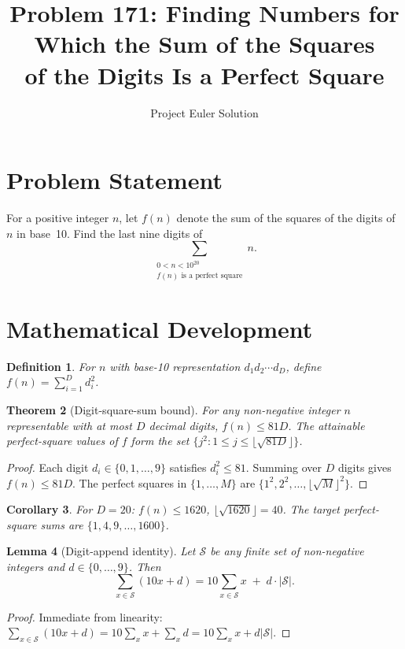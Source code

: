 \documentclass[11pt]{article}
\title{Problem 171: Finding Numbers for Which the Sum of the Squares\\of the Digits Is a Perfect Square}
\author{Project Euler Solution}
\date{}
\newtheorem{theorem}{Theorem}
\newtheorem{lemma}[theorem]{Lemma}
\newtheorem{corollary}[theorem]{Corollary}
\newtheorem{definition}[theorem]{Definition}
\begin{document}
\maketitle

\section{Problem Statement}

For a positive integer $n$, let $f(n)$ denote the sum of the squares of the digits of $n$ in base~10. Find the last nine digits of
\[
\sum_{\substack{0 < n < 10^{20} \\ f(n) \text{ is a perfect square}}} n.
\]

\section{Mathematical Development}

\begin{definition}
For $n$ with base-10 representation $d_1 d_2 \cdots d_D$, define $f(n) = \sum_{i=1}^{D} d_i^2$.
\end{definition}

\begin{theorem}[Digit-square-sum bound]
For any non-negative integer $n$ representable with at most $D$ decimal digits, $f(n) \leq 81D$. The attainable perfect-square values of $f$ form the set $\{j^2 : 1 \leq j \leq \lfloor\sqrt{81D}\rfloor\}$.
\end{theorem}

\begin{proof}
Each digit $d_i \in \{0,1,\ldots,9\}$ satisfies $d_i^2 \leq 81$. Summing over $D$ digits gives $f(n) \leq 81D$. The perfect squares in $\{1,\ldots,M\}$ are $\{1^2,2^2,\ldots,\lfloor\sqrt{M}\rfloor^2\}$.
\end{proof}

\begin{corollary}
For $D = 20$: $f(n) \leq 1620$, $\lfloor\sqrt{1620}\rfloor = 40$. The target perfect-square sums are $\{1,4,9,\ldots,1600\}$.
\end{corollary}

\begin{lemma}[Digit-append identity]
Let $\mathcal{S}$ be any finite set of non-negative integers and $d \in \{0,\ldots,9\}$. Then
\[
\sum_{x \in \mathcal{S}} (10x + d) = 10\sum_{x \in \mathcal{S}} x \;+\; d \cdot |\mathcal{S}|.
\]
\end{lemma}

\begin{proof}
Immediate from linearity: $\sum_{x \in \mathcal{S}} (10x+d) = 10\sum_{x} x + \sum_{x} d = 10\sum_{x} x + d|\mathcal{S}|$.
\end{proof}
\end{document}
